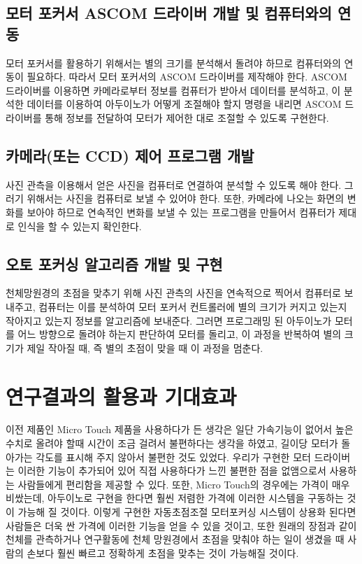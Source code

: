 \documentclass{abstract_hutech}
\begin{document}
\subsection{모터 포커서 ASCOM 드라이버 개발 및 컴퓨터와의 연동}

모터 포커서를 활용하기 위해서는 별의 크기를 분석해서 돌려야 하므로 컴퓨터와의 연동이 필요하다. 따라서 모터 포커서의 ASCOM 드라이버를 제작해야 한다. ASCOM 드라이버를 이용하면 카메라로부터 정보를 컴퓨터가 받아서 데이터를 분석하고, 이 분석한 데이터를 이용하여 아두이노가 어떻게 조절해야 할지 명령을 내리면 ASCOM 드라이버를 통해 정보를 전달하여 모터가 제어한 대로 조절할 수 있도록 구현한다.

\subsection{카메라(또는 CCD) 제어 프로그램 개발}

사진 관측을 이용해서 얻은 사진을 컴퓨터로 연결하여 분석할 수 있도록 해야 한다. 그러기 위해서는 사진을 컴퓨터로 보낼 수 있어야 한다. 또한, 카메라에 나오는 화면의 변화를 보아야 하므로 연속적인 변화를 보낼 수 있는 프로그램을 만들어서 컴퓨터가 제대로 인식을 할 수 있는지 확인한다.

\subsection{오토 포커싱 알고리즘 개발 및 구현}

천체망원경의 초점을 맞추기 위해 사진 관측의 사진을 연속적으로 찍어서 컴퓨터로 보내주고, 컴퓨터는 이를 분석하여 모터 포커서 컨트롤러에 별의 크기가 커지고 있는지 작아지고 있는지 정보를 알고리즘에 보내준다. 그러면 프로그래밍 된 아두이노가 모터를 어느 방향으로 돌려야 하는지 판단하여 모터를 돌리고, 이 과정을 반복하여 별의 크기가 제일 작아질 때, 즉 별의 초점이 맞을 때 이 과정을 멈춘다.

\section{연구결과의 활용과 기대효과}

이전 제품인 Micro Touch 제품을 사용하다가 든 생각은 일단 가속기능이 없어서 높은 수치로 올려야 할때 시간이 조금 걸려서 불편하다는 생각을 하였고, 길이당 모터가 돌아가는 각도를 표시해 주지 않아서 불편한 것도 있었다. 우리가 구현한 모터 드라이버는 이러한 기능이 추가되어 있어 직접 사용하다가 느낀 불편한 점을 없앰으로서 사용하는 사람들에게 편리함을 제공할 수 있다. 또한, Micro Touch의 경우에는 가격이 매우 비쌌는데, 아두이노로 구현을 한다면 훨씬 저렴한 가격에 이러한 시스템을 구동하는 것이 가능해 질 것이다. 이렇게 구현한 자동초점조절 모터포커싱 시스템이 상용화 된다면 사람들은 더욱 싼 가격에 이러한 기능을 얻을 수 있을 것이고, 또한 원래의 장점과 같이 천체를 관측하거나 연구활동에 천체 망원경에서 초점을 맞춰야 하는 일이 생겼을 때 사람의 손보다 훨씬 빠르고 정확하게 초점을 맞추는 것이 가능해질 것이다.

\end{document}
